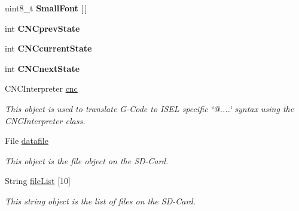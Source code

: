 \begin{DoxyCompactItemize}
\item 
\hypertarget{_c_n_c_interface_8ino_ae06862ff8cc2b8ad40c62171fb1b3529}{uint8\-\_\-t {\bfseries Small\-Font} \mbox{[}$\,$\mbox{]}}\label{_c_n_c_interface_8ino_ae06862ff8cc2b8ad40c62171fb1b3529}

\item 
\hypertarget{_c_n_c_interface_8ino_ade76ad07eca6e3f6d70ad66c9bfdb573}{int {\bfseries C\-N\-Cprev\-State}}\label{_c_n_c_interface_8ino_ade76ad07eca6e3f6d70ad66c9bfdb573}

\item 
\hypertarget{_c_n_c_interface_8ino_a2560f933dcf9a8a4200680072bfb4651}{int {\bfseries C\-N\-Ccurrent\-State}}\label{_c_n_c_interface_8ino_a2560f933dcf9a8a4200680072bfb4651}

\item 
\hypertarget{_c_n_c_interface_8ino_adccee4ef7eff4432488ba908b4ee6de1}{int {\bfseries C\-N\-Cnext\-State}}\label{_c_n_c_interface_8ino_adccee4ef7eff4432488ba908b4ee6de1}

\item 
\hypertarget{_c_n_c_interface_8ino_a5d077cd8369bd87151bdc999c93410bd}{C\-N\-C\-Interpreter \hyperlink{_c_n_c_interface_8ino_a5d077cd8369bd87151bdc999c93410bd}{cnc}}\label{_c_n_c_interface_8ino_a5d077cd8369bd87151bdc999c93410bd}

\begin{DoxyCompactList}\small\item\em This object is used to translate G-\/\-Code to I\-S\-E\-L specific \char`\"{}@....\char`\"{} syntax using the C\-N\-C\-Interpreter class. \end{DoxyCompactList}\item 
\hypertarget{_c_n_c_interface_8ino_a23a32c6a49e08840fc5e4b8c73ca94e8}{File \hyperlink{_c_n_c_interface_8ino_a23a32c6a49e08840fc5e4b8c73ca94e8}{datafile}}\label{_c_n_c_interface_8ino_a23a32c6a49e08840fc5e4b8c73ca94e8}

\begin{DoxyCompactList}\small\item\em This object is the file object on the S\-D-\/\-Card. \end{DoxyCompactList}\item 
String \hyperlink{_c_n_c_interface_8ino_a5a05dbbdadb25aa91e63ea51a8a2ec14}{file\-List} \mbox{[}10\mbox{]}
\begin{DoxyCompactList}\small\item\em This string object is the list of files on the S\-D-\/\-Card. \end{DoxyCompactList}\end{DoxyCompactItemize}



